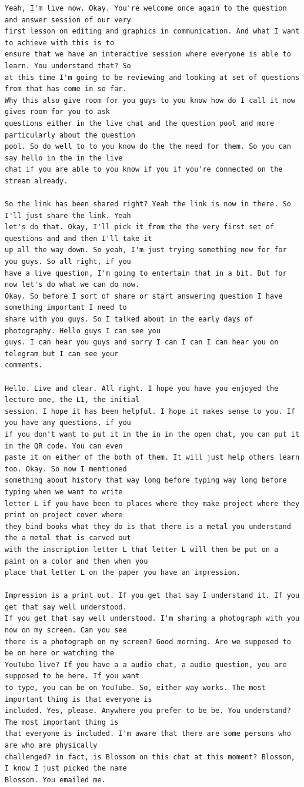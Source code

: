 {\small
\begin{Verbatim}
Yeah, I'm live now. Okay. You're welcome once again to the question and answer session of our very
first lesson on editing and graphics in communication. And what I want to achieve with this is to
ensure that we have an interactive session where everyone is able to learn. You understand that? So
at this time I'm going to be reviewing and looking at set of questions from that has come in so far.
Why this also give room for you guys to you know how do I call it now gives room for you to ask
questions either in the live chat and the question pool and more particularly about the question
pool. So do well to to you know do the the need for them. So you can say hello in the in the live
chat if you are able to you know if you if you're connected on the stream already.

So the link has been shared right? Yeah the link is now in there. So I'll just share the link. Yeah
let's do that. Okay, I'll pick it from the the very first set of questions and and then I'll take it
up all the way down. So yeah, I'm just trying something new for for you guys. So all right, if you
have a live question, I'm going to entertain that in a bit. But for now let's do what we can do now.
Okay. So before I sort of share or start answering question I have something important I need to
share with you guys. So I talked about in the early days of photography. Hello guys I can see you
guys. I can hear you guys and sorry I can I can I can hear you on telegram but I can see your
comments.

Hello. Live and clear. All right. I hope you have you enjoyed the lecture one, the L1, the initial
session. I hope it has been helpful. I hope it makes sense to you. If you have any questions, if you
if you don't want to put it in the in in the open chat, you can put it in the QR code. You can even
paste it on either of the both of them. It will just help others learn too. Okay. So now I mentioned
something about history that way long before typing way long before typing when we want to write
letter L if you have been to places where they make project where they print on project cover where
they bind books what they do is that there is a metal you understand the a metal that is carved out
with the inscription letter L that letter L will then be put on a paint on a color and then when you
place that letter L on the paper you have an impression.

Impression is a print out. If you get that say I understand it. If you get that say well understood.
If you get that say well understood. I'm sharing a photograph with you now on my screen. Can you see
there is a photograph on my screen? Good morning. Are we supposed to be on here or watching the
YouTube live? If you have a a audio chat, a audio question, you are supposed to be here. If you want
to type, you can be on YouTube. So, either way works. The most important thing is that everyone is
included. Yes, please. Anywhere you prefer to be be. You understand? The most important thing is
that everyone is included. I'm aware that there are some persons who are who are physically
challenged? in fact, is Blossom on this chat at this moment? Blossom, I know I just picked the name
Blossom. You emailed me.


\end{Verbatim}}
